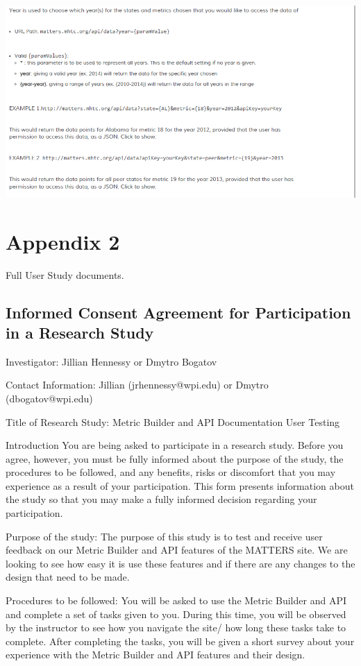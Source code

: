 \begin{center}
\includegraphics[width=0.9\linewidth]{images/docs3}
\end{center}

\section{Appendix 2}

Full User Study documents.

\subsection{Informed Consent Agreement for Participation in a Research Study}

Investigator: Jillian Hennessy or Dmytro Bogatov 

Contact Information: Jillian (jrhennessy@wpi.edu) or Dmytro (dbogatov@wpi.edu)

Title of Research Study: Metric Builder and API Documentation User Testing


Introduction 
You are being asked to participate in a research study.  Before you agree, however, you must be fully informed about the purpose of the study, 
the procedures to be followed, and any benefits, risks or discomfort that you may experience as a result of your participation.  
This form presents information about the study so that you may make a fully informed decision regarding your participation. 

Purpose of the study:  The purpose of this study is to test and receive user feedback on our Metric Builder and API features of the MATTERS site. 
We are looking to see how easy it is use these features and if there are any changes to the design that need to be made.

Procedures to be followed:  You will be asked to use the Metric Builder and API and complete a set of tasks given to you. 
During this time, you will be observed by the instructor to see how you navigate the site/ how long these tasks take to complete. 
After completing the tasks, you will be given a short survey about your experience with the Metric Builder and API features and their design.

